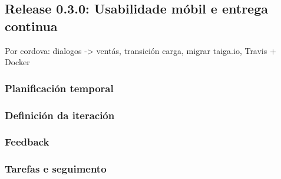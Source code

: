     \subsection{Release 0.3.0: Usabilidade móbil e entrega continua}
    Por cordova: dialogos -> ventás, transición carga, migrar taiga.io, Travis + 
Docker
      \subsubsection{Planificación temporal}
      \subsubsection{Definición da iteración}
      \subsubsection{Feedback}
      \subsubsection{Tarefas e seguimento}


